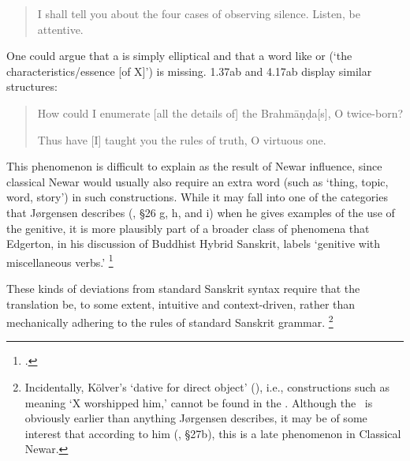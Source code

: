 \begin{quote}

        I shall tell you about the four cases of observing silence. 
        Listen, be attentive.
\end{quote}

\noindent
One could argue that  a is simply elliptical and that
a word like  or  
(`the characteristics/\thinspace essence [of X]') is missing. 1.37ab and 4.17ab
display similar structures:

\begin{quote}


How could I enumerate [all the details of] the Brahmāṇḍa[s], O twice-born?


Thus have [I] taught you the rules of truth, O virtuous one.

\end{quote}

\noindent
This phenomenon is difficult to explain as the result of Newar influence, since
classical Newar would usually also require an extra word (such as  `thing, topic, word, story') 
in such constructions. While it may fall into one of the categories that 
Jørgensen describes (\citeyear{JorgensenGrammar}, \S 26 g, h, and i)
when he gives examples of the use of the genitive,
it is more plausibly part of a broader class of phenomena that Edgerton,
in his discussion of Buddhist Hybrid Sanskrit,
labels `genitive with miscellaneous verbs.'%
		\footnote{.}


These kinds of deviations from standard Sanskrit syntax require that 
the translation be, to some extent, intuitive and context-driven,
rather than mechanically adhering to the rules of standard Sanskrit grammar.%
        \footnote{Incidentally, Kölver's `dative for direct object'
                (), i.e., constructions such as 
                 meaning `X worshipped him,' cannot be found in the \VSS.
                Although the \VSS\ is obviously earlier than anything Jørgensen describes,
                it may be of some interest that according to him (\citeyear{JorgensenGrammar}, \S 27b),
                this is a late phenomenon in Classical Newar.}

